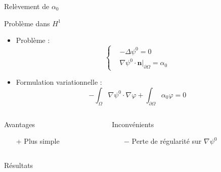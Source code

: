 \documentclass{beamer}
\newcommand{\grad}{{\nabla}}
\newcommand{\laplace}{{\Delta}}
\newcommand{\restr}{{\big\rvert_{\partial\Omega}}}
\begin{document}
\begin{frame}{Relèvement de $\alpha_0$}
\begin{block}{Problème dans $H^1$}
\begin{itemize}
\item Problème :
\[\left\{\begin{aligned}
&-\laplace\psi^0 = 0\\
&\grad\psi^0\cdot \mathbf{n}\restr=\alpha_0
\end{aligned}\right.\]
\item Formulation variationnelle :
\[ -\int_\Omega \grad\psi^0\cdot\grad\varphi + \int_{\partial\Omega} \alpha_0\varphi = 0 \]
\end{itemize}
\end{block}
\begin{columns}[t]
\begin{column}{5cm}
\begin{exampleblock}{Avantages}
\begin{itemize}
\item[+] Plus simple
\end{itemize}
\end{exampleblock}
\end{column}
\begin{column}{5cm}
\begin{alertblock}{Inconvénients}
\begin{itemize}
\item[$-$] Perte de régularité sur $\grad\psi^0$
\end{itemize}
\end{alertblock}
\end{column}
\end{columns}
\end{frame}

\begin{frame}
Résultats
\end{frame}
\end{document}
